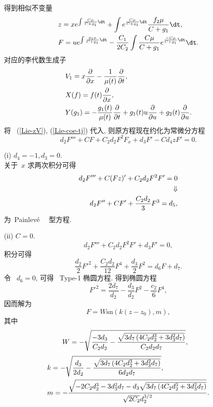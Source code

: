 得到相似不变量
\begin{align}\label{Lie-zV}
&z=x e^{\int\frac{C\mu}{C+g_1}\dt}+\int e^{\frac{C\mu}{C+g_1}\dt}\frac{f_2\mu}{C+g_1}\dt,\notag\\
&F=u e^{\int\frac{g_1\mu}{C+g_1}\dt}-\frac{C_1}{2C_2}\int\frac{C\mu}{C+g_1}e^{\frac{-C\mu}{C+g_1}\dt}\dt.
\end{align}
对应的李代数生成子
\begin{align}\label{Lie-algebra}
&V_1=x\frac{\partial}{\partial x}-\frac{1}{\mu(t)}\frac{\partial}{\partial t},\notag\\
&X(f)=f(t)\frac{\partial}{\partial x},\notag\\
&Y(g_1)=-\frac{g_1(t)}{\mu(t)}\frac{\partial}{\partial t}+g_1(t)u\frac{\partial}{\partial u}+g_2(t)\frac{\partial}{\partial u}.
\end{align}
将~ (\ref{Lie-zV}), (\ref{Lie-coe-tj}) 代入, 则原方程现在约化为常微分方程
\begin{equation}
d_2 F'''+C F+C_2 d_2 F^2F_x+d_3 F'-C d_4 zF'=0.
\end{equation}

(i) $d_4=-1, d_3=0$.\\
关于~$x$ 求两次积分可得
\begin{align}
d_2 F'''+C (Fz)'+C_2d_2 F^2F'=0 \\
\Downarrow\notag\\
d_2 F''+C F'+\frac{C_2d_2}{3}F^3=d_5,
\end{align}
为~Painlev\'{e}\ ~\uppercase\expandafter{} 型方程.

(ii) $C=0$.\\
\begin{equation*}
d_2 F'''+C_2d_2 F^2F'+d_3 F'=0,
\end{equation*}
积分可得
\begin{equation}
\frac{d_2}{2}F'^2+\frac{C_2d_2}{12}F^4+\frac{d_3}{2}F^2=d_6 F+d_7.
\end{equation}
令~ $d_6=0$, 可得~ Type-1 椭圆方程.
得到椭圆方程
\begin{equation}
F'^2=\frac{2d_7}{d_2}-\frac{d_3}{d_2}F^2-\frac{c_2}{6}F^4,
\end{equation}
因而解为
\begin{equation}
F=W \text{sn}(k(z-z_0),m),
\end{equation}
其中
\begin{align}
&W=-\sqrt{\frac{-3 d_3}{C_2d_2}-\frac{\sqrt{3 d_7 \left(4 C_2 d_2^3+3 d_3^2 d_7\right)}}{C_2d_2d_7}},\notag
\end{align}
\begin{align}
&k=-\sqrt{\frac{ d_3}{2d_2}-\frac{\sqrt{3d_7 \left(4 C_2 d_2^3+3 d_3^2 d_7\right)}}{6 d_2 d_7}},\notag\\
&m=-\frac{\sqrt {-2 C_2 d_2^3-3 d_3^2 d_7- d_3 \sqrt{3d_7 \left(4 C_2 d_2^3+3 d_3^2 d_7\right)}}}{\sqrt{2 C_2} d_2^{3/2}}.
\end{align}
